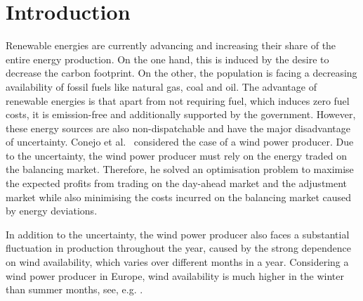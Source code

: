 \section{Introduction}

Renewable energies are currently advancing and increasing their share of the entire energy production. On the one hand, this is induced by the desire to decrease the carbon footprint. On the other, the population is facing a decreasing availability of fossil fuels like natural gas, coal and oil. The advantage of renewable energies is that apart from not requiring fuel, which induces zero fuel costs, it is emission-free and additionally supported by the government. However, these energy sources are also non-dispatchable and have the major disadvantage of uncertainty. Conejo et al.\ \cite{Conejo10} considered the case of a wind power producer. Due to the uncertainty, the wind power producer must rely on the energy traded on the balancing market. Therefore, he solved an optimisation problem to maximise the expected profits from trading on the day-ahead market and the adjustment market while also minimising the costs incurred on the balancing market caused by energy deviations. 

In addition to the uncertainty, the wind power producer also faces a substantial fluctuation in production throughout the year, caused by the strong dependence on wind availability, which varies over different months in a year. Considering a wind power producer in Europe, wind availability is much higher in the winter than summer months, see, e.g. \cite{W11}. 

